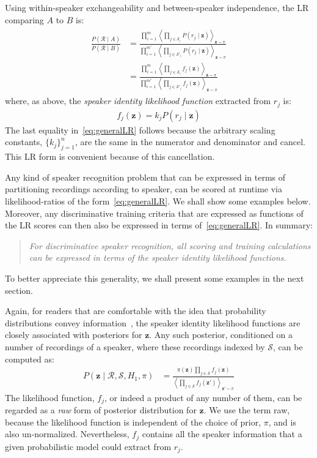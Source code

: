 \documentclass[a4paper,oneside,12pt,english]{report}
\def\zvec{\mathbf{z}}
\def\expvb#1#2{\left\langle#1\right\rangle_{#2}}
\def\Rset{\mathcal{R}}
\def\Sset{\mathcal{S}}
\begin{document}
Using within-speaker exchangeability and between-speaker independence, the LR comparing $A$ to $B$ is:
\begin{align}
\label{eq:generalLR}
\begin{split}
\frac{P(\Rset\mid A)}{P(\Rset\mid B)} &=
\frac{\prod_{i=1}^m \expvb{\prod_{j\in\Sset_i} P(r_j\mid\zvec)}{\zvec\sim\pi}}
{\prod_{i=1}^{m'} \expvb{\prod_{j\in\Sset'_i} P(r_j\mid\zvec)}{\zvec\sim\pi}} \\
&= \frac{\prod_{i=1}^m \expvb{\prod_{j\in\Sset_i} f_j(\zvec)}{\zvec\sim\pi}}
{\prod_{i=1}^{m'} \expvb{\prod_{j\in\Sset'_i} f_j(\zvec)}{\zvec\sim\pi}} 
\end{split}
\end{align}
where, as above, the \emph{speaker identity likelihood function} extracted from $r_j$ is:
\begin{align}
f_j(\zvec)=k_jP(r_j\mid\zvec)
\end{align}
The last equality in~\eqref{eq:generalLR} follows because the arbitrary scaling constants, $\{k_j\}_{j=1}^n$, are the same in the numerator and denominator and cancel. This LR form is convenient because of this cancellation.

Any kind of speaker recognition problem that can be expressed in terms of partitioning recordings according to speaker, can be scored at runtime via likelihood-ratios of the form~\eqref{eq:generalLR}. We shall show some examples below.  Moreover, any discriminative training criteria that are expressed as functions of the LR scores can then also be expressed in terms of~\eqref{eq:generalLR}. In summary: 
\begin{quote}
\emph{For discriminative speaker recognition, all scoring and training calculations can be expressed in terms of the speaker identity likelihood functions.} 
\end{quote}
To better appreciate this generality, we shall present some examples in the next section.

Again, for readers that are comfortable with the idea that probability distributions convey information~\cite{PTLOS}, the speaker identity likelihood functions are closely associated with posteriors for $\zvec$. Any such posterior, conditioned on a number of recordings of a speaker, where these recordings indexed by $\Sset$, can be computed as:
\begin{align}
P(\zvec\mid \Rset,\Sset,H_1,\pi) &=\frac{\pi(\zvec)\prod_{j\in\Sset}f_j(\zvec)}{\expvb{\prod_{j\in\Sset}f_j(\zvec')}{\zvec'\sim\pi}}
\end{align}
The likelihood function, $f_j$, or indeed a product of any number of them, can be regarded as a \emph{raw} form of posterior distribution for $\zvec$. We use the term raw, because the likelihood function is independent of the choice of prior, $\pi$, and is also un-normalized. Nevertheless, $f_j$ contains all the speaker information that a given probabilistic model could extract from $r_j$.
\end{document}
